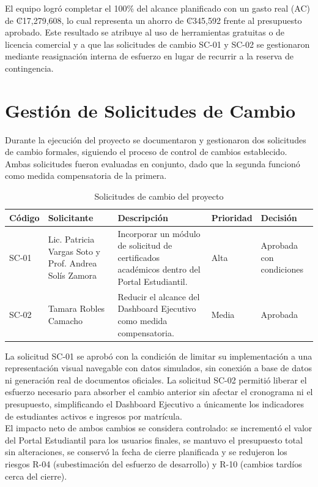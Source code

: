\documentclass[11pt,spanish]{article}
\begin{document}
El equipo logró completar el 100\% del alcance planificado con un gasto real (AC) de ₡17,279,608, lo cual representa un ahorro de ₡345,592 frente al presupuesto aprobado. Este resultado se atribuye al uso de herramientas gratuitas o de licencia comercial y a que las solicitudes de cambio SC-01 y SC-02 se gestionaron mediante reasignación interna de esfuerzo en lugar de recurrir a la reserva de contingencia.

\section{Gestión de Solicitudes de Cambio}

Durante la ejecución del proyecto se documentaron y gestionaron dos solicitudes de cambio formales, siguiendo el proceso de control de cambios establecido. Ambas solicitudes fueron evaluadas en conjunto, dado que la segunda funcionó como medida compensatoria de la primera.

\begin{table}[H]
\centering
\caption{Solicitudes de cambio del proyecto}
\label{tab:cambios}
{\small
\begin{tabularx}{\textwidth}{p{1.5cm}p{3cm}Yp{1.7cm}p{2cm}}
\toprule
\textbf{Código} &
\textbf{Solicitante} &
\textbf{Descripción} &
\textbf{Prioridad} &
\textbf{Decisión} \\
\midrule

SC-01 &
Lic. Patricia Vargas Soto y Prof. Andrea Solís Zamora &
Incorporar un módulo de solicitud de certificados académicos dentro del Portal Estudiantil.
&
Alta &
Aprobada con condiciones
\\

SC-02 &
Tamara Robles Camacho &
Reducir el alcance del Dashboard Ejecutivo como medida compensatoria.
&
Media &
Aprobada
\\

\bottomrule
\end{tabularx}
}
\end{table}

La solicitud SC-01 se aprobó con la condición de limitar su implementación a una representación visual navegable con datos simulados, sin conexión a base de datos ni generación real de documentos oficiales. La solicitud SC-02 permitió liberar el esfuerzo necesario para absorber el cambio anterior sin afectar el cronograma ni el presupuesto, simplificando el Dashboard Ejecutivo a únicamente los indicadores de estudiantes activos e ingresos por matrícula.\\
El impacto neto de ambos cambios se considera controlado: se incrementó el valor del Portal Estudiantil para los usuarios finales, se mantuvo el presupuesto total sin alteraciones, se conservó la fecha de cierre planificada y se redujeron los riesgos R-04 (subestimación del esfuerzo de desarrollo) y R-10 (cambios tardíos cerca del cierre).
\end{document}
